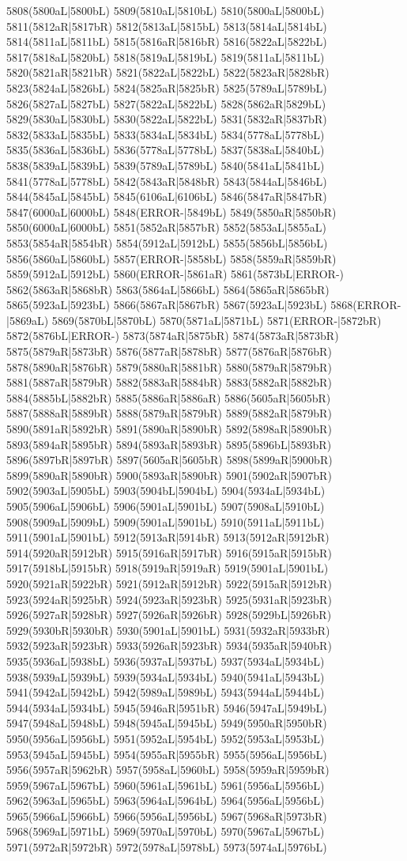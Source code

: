 5808(5800aL|5800bL) 5809(5810aL|5810bL) 5810(5800aL|5800bL) 5811(5812aR|5817bR) 5812(5813aL|5815bL) 5813(5814aL|5814bL) 5814(5811aL|5811bL) 5815(5816aR|5816bR) 5816(5822aL|5822bL) 5817(5818aL|5820bL) 5818(5819aL|5819bL) 5819(5811aL|5811bL) 5820(5821aR|5821bR) 5821(5822aL|5822bL) 5822(5823aR|5828bR) 5823(5824aL|5826bL) 5824(5825aR|5825bR) 5825(5789aL|5789bL) 5826(5827aL|5827bL) 5827(5822aL|5822bL) 5828(5862aR|5829bL) 5829(5830aL|5830bL) 5830(5822aL|5822bL) 5831(5832aR|5837bR) 5832(5833aL|5835bL) 5833(5834aL|5834bL) 5834(5778aL|5778bL) 5835(5836aL|5836bL) 5836(5778aL|5778bL) 5837(5838aL|5840bL) 5838(5839aL|5839bL) 5839(5789aL|5789bL) 5840(5841aL|5841bL) 5841(5778aL|5778bL) 5842(5843aR|5848bR) 5843(5844aL|5846bL) 5844(5845aL|5845bL) 5845(6106aL|6106bL) 5846(5847aR|5847bR) 5847(6000aL|6000bL) 5848(ERROR-|5849bL) 5849(5850aR|5850bR) 5850(6000aL|6000bL) 5851(5852aR|5857bR) 5852(5853aL|5855aL) 5853(5854aR|5854bR) 5854(5912aL|5912bL) 5855(5856bL|5856bL) 5856(5860aL|5860bL) 5857(ERROR-|5858bL) 5858(5859aR|5859bR) 5859(5912aL|5912bL) 5860(ERROR-|5861aR) 5861(5873bL|ERROR-) 5862(5863aR|5868bR) 5863(5864aL|5866bL) 5864(5865aR|5865bR) 5865(5923aL|5923bL) 5866(5867aR|5867bR) 5867(5923aL|5923bL) 5868(ERROR-|5869aL) 5869(5870bL|5870bL) 5870(5871aL|5871bL) 5871(ERROR-|5872bR) 5872(5876bL|ERROR-) 5873(5874aR|5875bR) 5874(5873aR|5873bR) 5875(5879aR|5873bR) 5876(5877aR|5878bR) 5877(5876aR|5876bR) 5878(5890aR|5876bR) 5879(5880aR|5881bR) 5880(5879aR|5879bR) 5881(5887aR|5879bR) 5882(5883aR|5884bR) 5883(5882aR|5882bR) 5884(5885bL|5882bR) 5885(5886aR|5886aR) 5886(5605aR|5605bR) 5887(5888aR|5889bR) 5888(5879aR|5879bR) 5889(5882aR|5879bR) 5890(5891aR|5892bR) 5891(5890aR|5890bR) 5892(5898aR|5890bR) 5893(5894aR|5895bR) 5894(5893aR|5893bR) 5895(5896bL|5893bR) 5896(5897bR|5897bR) 5897(5605aR|5605bR) 5898(5899aR|5900bR) 5899(5890aR|5890bR) 5900(5893aR|5890bR) 5901(5902aR|5907bR) 5902(5903aL|5905bL) 5903(5904bL|5904bL) 5904(5934aL|5934bL) 5905(5906aL|5906bL) 5906(5901aL|5901bL) 5907(5908aL|5910bL) 5908(5909aL|5909bL) 5909(5901aL|5901bL) 5910(5911aL|5911bL) 5911(5901aL|5901bL) 5912(5913aR|5914bR) 5913(5912aR|5912bR) 5914(5920aR|5912bR) 5915(5916aR|5917bR) 5916(5915aR|5915bR) 5917(5918bL|5915bR) 5918(5919aR|5919aR) 5919(5901aL|5901bL) 5920(5921aR|5922bR) 5921(5912aR|5912bR) 5922(5915aR|5912bR) 5923(5924aR|5925bR) 5924(5923aR|5923bR) 5925(5931aR|5923bR) 5926(5927aR|5928bR) 5927(5926aR|5926bR) 5928(5929bL|5926bR) 5929(5930bR|5930bR) 5930(5901aL|5901bL) 5931(5932aR|5933bR) 5932(5923aR|5923bR) 5933(5926aR|5923bR) 5934(5935aR|5940bR) 5935(5936aL|5938bL) 5936(5937aL|5937bL) 5937(5934aL|5934bL) 5938(5939aL|5939bL) 5939(5934aL|5934bL) 5940(5941aL|5943bL) 5941(5942aL|5942bL) 5942(5989aL|5989bL) 5943(5944aL|5944bL) 5944(5934aL|5934bL) 5945(5946aR|5951bR) 5946(5947aL|5949bL) 5947(5948aL|5948bL) 5948(5945aL|5945bL) 5949(5950aR|5950bR) 5950(5956aL|5956bL) 5951(5952aL|5954bL) 5952(5953aL|5953bL) 5953(5945aL|5945bL) 5954(5955aR|5955bR) 5955(5956aL|5956bL) 5956(5957aR|5962bR) 5957(5958aL|5960bL) 5958(5959aR|5959bR) 5959(5967aL|5967bL) 5960(5961aL|5961bL) 5961(5956aL|5956bL) 5962(5963aL|5965bL) 5963(5964aL|5964bL) 5964(5956aL|5956bL) 5965(5966aL|5966bL) 5966(5956aL|5956bL) 5967(5968aR|5973bR) 5968(5969aL|5971bL) 5969(5970aL|5970bL) 5970(5967aL|5967bL) 5971(5972aR|5972bR) 5972(5978aL|5978bL) 5973(5974aL|5976bL) 